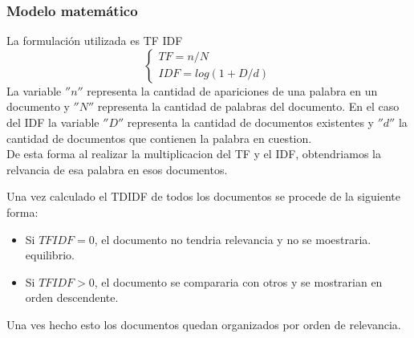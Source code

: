 \documentclass{beamer}
\begin{document}
\begin{frame}
\frametitle{Modelo matemático}
\begin{minipage}{10cm}
	La formulación utilizada es TF IDF \\
	\begin{equation}\label{eq:general}
			\begin{cases}
			TF = n/N   \\
			IDF = log(1+D/d)
			\end{cases}
	\end{equation} 
	La variable $''n''$ representa la cantidad de apariciones de una palabra en un documento y $''N''$ representa la cantidad de palabras del documento. En el caso del IDF la variable $''D''$ representa la cantidad de documentos existentes y $''d''$ la cantidad de documentos que contienen la palabra en cuestion. \\
	De esta forma al realizar la multiplicacion del TF y el IDF, obtendriamos la relvancia de esa palabra en esos documentos.
\end{minipage}

\end{frame}	

\begin{frame}
	\begin{minipage}{10 cm}
		Una vez calculado el TDIDF de todos los documentos se procede de la siguiente forma:
		\begin{itemize}
			\item Si $TFIDF=0$, el documento no tendria relevancia y no se moestraria.
			equilibrio.
			\item Si $TFIDF > 0$, el documento se compararia con otros y se mostrarian en orden descendente.
		\end{itemize}
	Una ves hecho esto los documentos quedan organizados por orden de relevancia.
	\end{minipage}
\end{frame}
\end{document}
